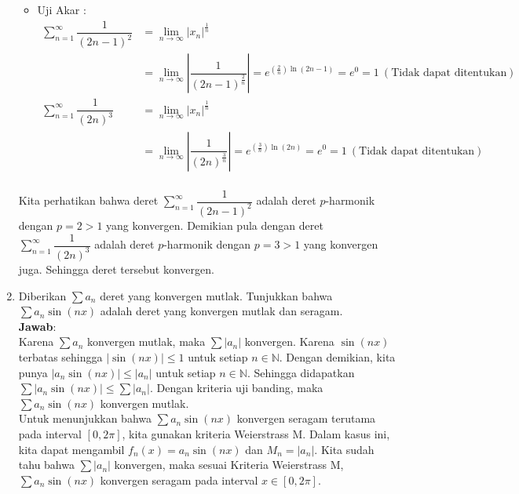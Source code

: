 \documentclass[a4paper, 12pt]{article}
\newcommand{\ans}{\textbf{Jawab}:}
\newcommand{\N}{\mathbb{N}}
\begin{document}
\begin{enumerate}
\begin{itemize}
            \newpage
            \item Uji Akar : 
            \begin{align*}
                 \sum_{n=1}^{\infty}\dfrac{1}{(2n-1)^2} &= \lim_{n \to \infty} |x_n|^{\frac{1}{n}}\\
                 &= \lim_{n \to \infty} \left|\dfrac{1}{(2n-1)^{\frac{2}{n}}}\right| = e ^{(\frac{2}{n}) \ln (2n-1)} = e^0 = 1 \ (\text{Tidak dapat ditentukan}) \\
                 \sum_{n=1}^{\infty}\dfrac{1}{(2n)^3} &= \lim_{n \to \infty} |x_n|^{\frac{1}{n}}\\
                 &= \lim_{n \to \infty} \left| \dfrac{1}{(2n)^{\frac{3}{n}}}\right| = e ^{(\frac{3}{n}) \ln (2n)} = e^0 = 1 \ (\text{Tidak dapat ditentukan}) \\
            \end{align*}
        \end{itemize} 

        Kita perhatikan bahwa deret $\sum_{n=1}^{\infty}\dfrac{1}{(2n-1)^2}$ adalah deret $p$-harmonik dengan $p=2>1$ yang konvergen. 
        Demikian pula dengan deret $\sum_{n=1}^{\infty}\dfrac{1}{(2n)^3}$ adalah deret $p$-harmonik dengan $p=3>1$ yang konvergen juga.
        Sehingga deret tersebut konvergen.

        \item Diberikan $\sum a_n$ deret yang konvergen mutlak. Tunjukkan bahwa $\sum a_n \sin(nx)$ adalah deret yang konvergen mutlak dan seragam.\\
        \ans\\
        Karena $\sum a_n$ konvergen mutlak, maka $\sum |a_n|$ konvergen. Karena $\sin(nx)$ terbatas sehingga $|\sin(nx)|\leq 1$ untuk setiap $n\in\N$.
        Dengan demikian, kita punya $|a_n\sin(nx)|\leq |a_n|$ untuk setiap $n\in\N$. Sehingga didapatkan $\sum |a_n\sin(nx)|\leq \sum |a_n|$.
        Dengan kriteria uji banding, maka $\sum a_n\sin(nx)$ konvergen mutlak.\\
        Untuk menunjukkan bahwa $\sum a_n\sin(nx)$ konvergen seragam terutama pada interval $[0,2\pi]$, kita gunakan kriteria Weierstrass M. 
        Dalam kasus ini, kita dapat mengambil \(f_n(x) = a_n \sin(nx)\) dan \(M_n = |a_n|\). Kita sudah tahu bahwa \(\sum |a_n|\) konvergen, 
        maka sesuai Kriteria Weierstrass M, \(\sum a_n \sin(nx)\) konvergen seragam pada interval \(x \in [0, 2\pi]\).\\

    \end{enumerate}
\end{document}
